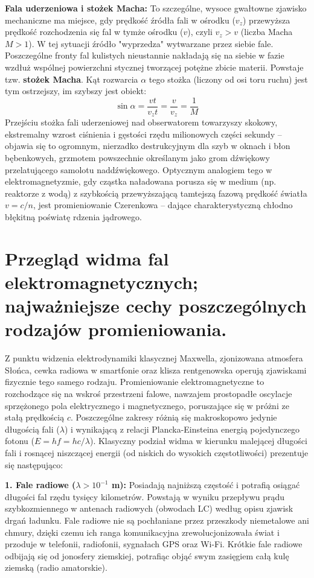 \documentclass[11pt, a4paper]{article}
\begin{document}
\textbf{Fala uderzeniowa i stożek Macha:}
To szczególne, wysoce gwałtowne zjawisko mechaniczne ma miejsce, gdy prędkość źródła fali w ośrodku ($v_z$) przewyższa prędkość rozchodzenia się fal w tymże ośrodku ($v$), czyli $v_z > v$ (liczba Macha $M > 1$). W tej sytuacji źródło "wyprzedza" wytwarzane przez siebie fale. Poszczególne fronty fal kulistych nieustannie nakładają się na siebie w fazie wzdłuż wspólnej powierzchni stycznej tworzącej potężne zbicie materii. Powstaje tzw. \textbf{stożek Macha}. Kąt rozwarcia $\alpha$ tego stożka (liczony od osi toru ruchu) jest tym ostrzejszy, im szybszy jest obiekt:
\[
\sin\alpha = \frac{vt}{v_z t} = \frac{v}{v_z} = \frac{1}{M}
\]
Przejściu stożka fali uderzeniowej nad obserwatorem towarzyszy skokowy, ekstremalny wzrost ciśnienia i gęstości rzędu milionowych części sekundy – objawia się to ogromnym, nierzadko destrukcyjnym dla szyb w oknach i błon bębenkowych, grzmotem powszechnie określanym jako grom dźwiękowy przelatującego samolotu naddźwiękowego. Optycznym analogiem tego w elektromagnetyzmie, gdy cząstka naładowana porusza się w medium (np. reaktorze z wodą) z szybkością przewyższającą tamtejszą fazową prędkość światła $v = c/n$, jest promieniowanie Czerenkowa – dające charakterystyczną chłodno błękitną poświatę rdzenia jądrowego.

\section{Przegląd widma fal elektromagnetycznych; najważniejsze cechy poszczególnych rodzajów promieniowania.}

Z punktu widzenia elektrodynamiki klasycznej Maxwella, zjonizowana atmosfera Słońca, cewka radiowa w smartfonie oraz klisza rentgenowska operują zjawiskami fizycznie tego samego rodzaju. Promieniowanie elektromagnetyczne to rozchodzące się na wskroś przestrzeni falowe, nawzajem prostopadłe oscylacje sprzężonego pola elektrycznego i magnetycznego, poruszające się w próżni ze stałą prędkością $c$. Poszczególne zakresy różnią się makroskopowo jedynie długością fali ($\lambda$) i wynikającą z relacji Plancka-Einsteina energią pojedynczego fotonu ($E = hf = hc/\lambda$). Klasyczny podział widma w kierunku malejącej długości fali i rosnącej niszczącej energii (od niskich do wysokich częstotliwości) prezentuje się następująco:

\textbf{1. Fale radiowe ($\lambda > 10^{-1}$ m):}
Posiadają najniższą częstość i potrafią osiągać długości fal rzędu tysięcy kilometrów. Powstają w wyniku przepływu prądu szybkozmiennego w antenach radiowych (obwodach LC) według opisu zjawisk drgań ładunku. Fale radiowe nie są pochłaniane przez przeszkody niemetalowe ani chmury, dzięki czemu ich ranga komunikacyjna zrewolucjonizowała świat i przoduje w telefonii, radiofonii, sygnałach GPS oraz Wi-Fi. Krótkie fale radiowe odbijają się od jonosfery ziemskiej, potrafiąc objąć swym zasięgiem całą kulę ziemską (radio amatorskie).
\end{document}
